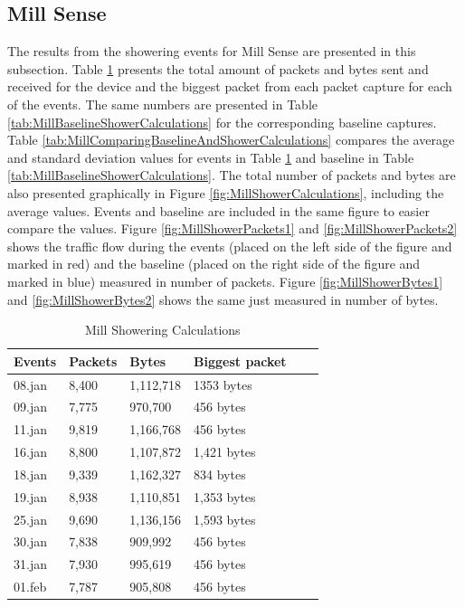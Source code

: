 \newpage
\newpage
\newpage
\subsection{Mill Sense}
The results from the showering events for Mill Sense are presented in this subsection. Table \ref{tab:MillShowerCalculations} presents the total amount of packets and bytes sent and received for the device and the biggest packet from each packet capture for each of the events. The same numbers are presented in Table \ref{tab:MillBaselineShowerCalculations} for the corresponding baseline captures. Table \ref{tab:MillComparingBaselineAndShowerCalculations} compares the average and standard deviation values for events in Table \ref{tab:MillShowerCalculations} and baseline in Table \ref{tab:MillBaselineShowerCalculations}. The total number of packets and bytes are also presented graphically in Figure \ref{fig:MillShowerCalculations}, including the average values. Events and baseline are included in the same figure to easier compare the values. Figure \ref{fig:MillShowerPackets1} and \ref{fig:MillShowerPackets2} shows the traffic flow during the events (placed on the left side of the figure and marked in red) and the baseline (placed on the right side of the figure and marked in blue) measured in number of packets. Figure \ref{fig:MillShowerBytes1} and \ref{fig:MillShowerBytes2} shows the same just measured in number of bytes. 
\begin{table}[H]
    \centering
    \caption{Mill Showering Calculations}
    \begin{tabular}{|l|l|l|l|l|l|}
    \hline
        \textbf{Events} & \textbf{Packets} & \textbf{Bytes} & \textbf{Biggest packet} \\ \hline
        08.jan & 8,400 & 1,112,718 & 1353 bytes   \\ \hline
        09.jan & 7,775 & 970,700   & 456 bytes   \\ \hline
        11.jan & 9,819 & 1,166,768 & 456 bytes   \\ \hline
        16.jan & 8,800 & 1,107,872 & 1,421 bytes \\ \hline
        18.jan & 9,339 & 1,162,327 & 834 bytes   \\ \hline
        19.jan & 8,938 & 1,110,851 & 1,353 bytes \\ \hline
        25.jan & 9,690 & 1,136,156 & 1,593 bytes \\ \hline
        30.jan & 7,838 & 909,992   & 456 bytes  \\ \hline
        31.jan & 7,930 & 995,619   & 456 bytes \\ \hline
        01.feb & 7,787 & 905,808   & 456 bytes \\ \hline
    \end{tabular}
    \label{tab:MillShowerCalculations}
\end{table}


